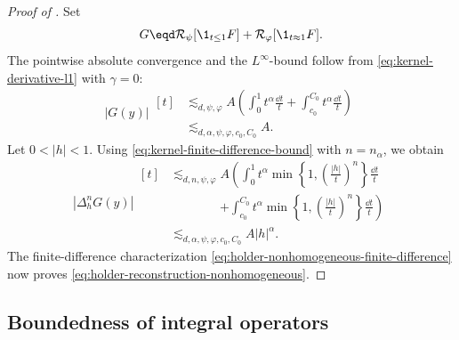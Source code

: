 \begin{proof}[Proof of ]
  {}
  Set
  \[
    G
    \eqd
    \mathcal{R}_{\psi}[\1_{t \le 1}F]
    +
    \mathcal{R}_{\varphi}[\1_{t \approx 1}F].
  \]
  The pointwise absolute convergence and the \(L^{\infty}\)-bound follow from
  \eqref{eq:kernel-derivative-l1} with \(\gamma = 0\):
  \[
    |G(y)|
    \begin{aligned}[t]
    &\lesssim_{d, \psi, \varphi}
    A
    \left(
      \int_0^1 t^{\alpha} \frac{\dd t}{t}
      +
      \int_{c_0}^{C_0} t^{\alpha} \frac{\dd t}{t}
    \right)
    \\
    &\lesssim_{d, \alpha, \psi, \varphi, c_0, C_0}
    A.
    \end{aligned}
  \]
  Let \(0 < |h| < 1\). Using
  \eqref{eq:kernel-finite-difference-bound} with \(n = n_{\alpha}\), we obtain
  \[
    |\Delta_h^n G(y)|
    \begin{aligned}[t]
    &\lesssim_{d, n, \psi, \varphi}
    A
    \left(
      \int_0^1
      t^{\alpha}
      \min
      \left\{
        1,
        \left(\frac{|h|}{t}\right)^n
      \right\}
      \frac{\dd t}{t}
    \right.
    \\
    &\qquad\qquad\left.
      +
      \int_{c_0}^{C_0}
      t^{\alpha}
      \min
      \left\{
        1,
        \left(\frac{|h|}{t}\right)^n
      \right\}
      \frac{\dd t}{t}
    \right)
    \\
    &\lesssim_{d, \alpha, \psi, \varphi, c_0, C_0}
    A |h|^{\alpha}.
    \end{aligned}
  \]
  The finite-difference characterization
  \eqref{eq:holder-nonhomogeneous-finite-difference} now proves
  \eqref{eq:holder-reconstruction-nonhomogeneous}.
\end{proof}

\subsection{Boundedness of integral operators}
\label{subsec:boundedness-integral-operators}

{}

{}

